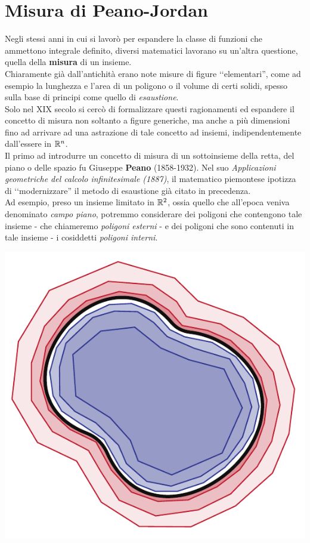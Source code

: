 \section{Misura di Peano-Jordan}
Negli stessi anni in cui si lavorò per espandere la classe di funzioni che ammettono integrale definito, diversi matematici lavorano su un'altra questione, quella della \textbf{misura} di un insieme.\\
Chiaramente già dall'antichità erano note misure di figure ‘‘elementari'', come ad esempio la lunghezza e l'area di un poligono o il volume di certi solidi, spesso sulla base di principi come quello di \textit{esaustione}.\\
Solo nel XIX secolo si cercò di formalizzare questi ragionamenti ed espandere il concetto di misura non soltanto a figure generiche, ma anche a più dimensioni fino ad arrivare ad una astrazione di tale concetto ad insiemi, indipendentemente dall'essere in $\mathbb{R}^n$.\\
Il primo ad introdurre un concetto di misura di un sottoinsieme della retta, del piano o delle spazio fu Giuseppe \textbf{Peano} (1858-1932). Nel suo \textit{Applicazioni geometriche del
calcolo infinitesimale (1887)}, il matematico piemontese ipotizza di ‘‘modernizzare'' il metodo di esaustione già citato in precedenza.\\
Ad esempio, preso un insieme limitato in $\mathbb{R}^2$, ossia quello che all'epoca veniva denominato \textit{campo piano}, potremmo considerare dei poligoni che contengono tale insieme - che chiameremo \textit{poligoni esterni} - e dei poligoni che sono contenuti in tale insieme - i cosiddetti \textit{poligoni interni}.
\begin{center}
	\includegraphics[trim=0cm 0cm 0cm 0cm, clip, scale=0.71]{images/peanopoligoni.pdf}
\end{center}
